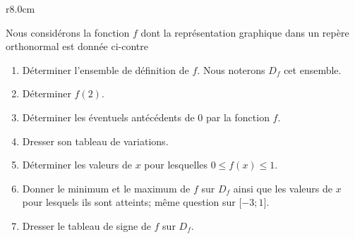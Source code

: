 
\begin{exercice}\label{exosmath-0547}

\begin{wrapfigure}{r}{8.0cm}
   \vspace{-0.5cm}        %
   \centering
   
\end{wrapfigure}

Nous considérons la fonction \( f\) dont la représentation graphique dans un repère orthonormal est donnée ci-contre 
\begin{enumerate}
    \item
        Déterminer l'ensemble de définition de \( f\). Nous noterons \( D_f\) cet ensemble.
    \item
        Déterminer \( f(2)\).
    \item
        Déterminer les éventuels antécédents de \( 0\) par la fonction \( f\).
    \item
        Dresser son tableau de variations.
    \item
        Déterminer les valeurs de \( x\) pour lesquelles \( 0\leq f(x)\leq 1\).
    \item
        Donner le minimum et le maximum de \( f\) sur \( D_f\) ainsi que les valeurs de \( x\) pour lesquels ils sont atteints; même question sur \( \mathopen[ -3 ; 1 \mathclose]\).
    \item
        Dresser le tableau de signe de \( f\) sur \( D_f\).
\end{enumerate}

\end{exercice}
